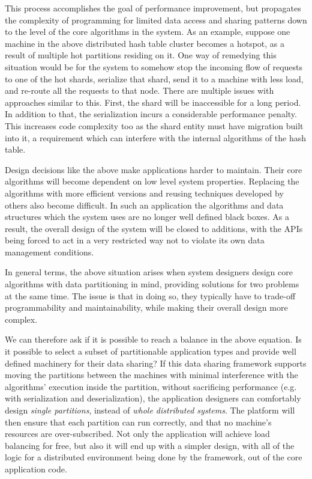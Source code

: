 This process accomplishes the goal of performance improvement, but propagates
the complexity of programming for limited data access and sharing patterns
down to the level of the core algorithms in the system. As an example, suppose
one machine in the above distributed hash table cluster becomes a hotspot,
as a result of multiple hot partitions residing on it. One way of
remedying this situation would be for the system to somehow stop the incoming
flow of requests to one of the hot shards, serialize that shard, send it to
a machine with less load, and re-route all the requests to that node. There
are multiple issues with approaches similar to this. First, the shard will be
inaccessible for a long period. In addition to that,
the serialization incurs a considerable performance penalty. This increases
code complexity too as the shard entity must have migration built into it,
a requirement which can interfere with the internal algorithms of the hash
table.

Design decisions like the above make applications harder to maintain. Their
core algorithms will become dependent on low level system properties.
Replacing the
algorithms with more efficient versions and reusing techniques developed by
others also become difficult. In such an application
the algorithms and data structures which the system uses are no longer well
defined black boxes. As a result, the overall design of the system will be
closed to additions, with the APIs being forced to act in a very restricted way
not to violate its own data management conditions.

In general terms, the above situation arises when system designers design
core algorithms with data partitioning in mind, providing solutions for two
problems at the same time. The issue is that in doing so, they typically have to
trade-off programmability and maintainability, while making their overall design
more complex.

We can therefore ask if it is possible to reach a balance in the above equation.
Is it possible to select a subset of partitionable application types
and provide well defined machinery for their data sharing? If this data sharing
framework supports moving the partitions between the machines with minimal
interference with the algorithms' execution inside the partition, without
sacrificing performance (e.g. with serialization and deserialization), the
application designers can comfortably design \emph{single partitions}, instead
of \emph{whole distributed systems}. The platform will then ensure that each
partition can run correctly, and that no machine's resources are
over-subscribed. Not only the application will achieve load balancing for free,
but also it will end up with a simpler design, with all
of the logic for a distributed environment being done by the framework,
out of the core application code.


